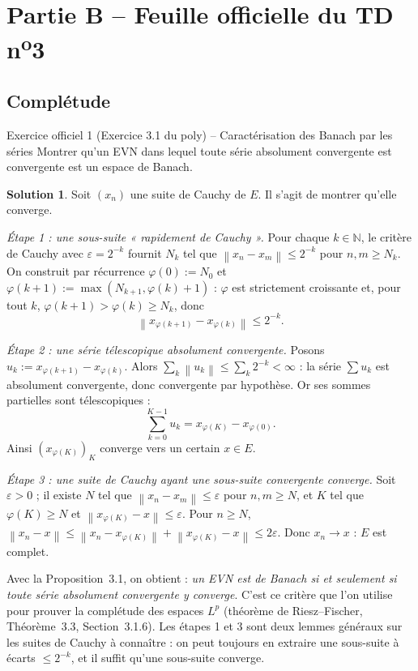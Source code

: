 \documentclass[11pt,a4paper]{article}
\newcommand{\N}{\mathbb{N}}
\newcommand{\norm}[1]{\left\|#1\right\|}
\theoremstyle{definition}
\newtheorem*{solution}{Solution}
\begin{document}
\section*{Partie B -- Feuille officielle du TD n\textsuperscript{o}3}

\subsection*{Complétude}

\begin{exo}{Exercice officiel 1 (Exercice 3.1 du poly) -- Caractérisation des Banach par les séries}
Montrer qu'un EVN dans lequel toute série absolument convergente est convergente est un espace de Banach.
\end{exo}

\begin{solution}
Soit $(x_n)$ une suite de Cauchy de $E$. Il s'agit de montrer qu'elle converge.

\emph{Étape 1 : une sous-suite « rapidement de Cauchy ».} Pour chaque $k\in\N$, le critère de Cauchy avec $\varepsilon=2^{-k}$ fournit $N_k$ tel que $\norm{x_n-x_m}\le2^{-k}$ pour $n,m\ge N_k$. On construit par récurrence $\varphi(0):=N_0$ et $\varphi(k+1):=\max(N_{k+1},\varphi(k)+1)$ : $\varphi$ est strictement croissante et, pour tout $k$, $\varphi(k+1)>\varphi(k)\ge N_k$, donc
\[
\norm{x_{\varphi(k+1)}-x_{\varphi(k)}}\le2^{-k}.
\]

\emph{Étape 2 : une série télescopique absolument convergente.} Posons $u_k:=x_{\varphi(k+1)}-x_{\varphi(k)}$. Alors $\sum_k\norm{u_k}\le\sum_k2^{-k}<\infty$ : la série $\sum u_k$ est absolument convergente, donc convergente par hypothèse. Or ses sommes partielles sont télescopiques :
\[
\sum_{k=0}^{K-1}u_k=x_{\varphi(K)}-x_{\varphi(0)} .
\]
Ainsi $(x_{\varphi(K)})_K$ converge vers un certain $x\in E$.

\emph{Étape 3 : une suite de Cauchy ayant une sous-suite convergente converge.} Soit $\varepsilon>0$ ; il existe $N$ tel que $\norm{x_n-x_m}\le\varepsilon$ pour $n,m\ge N$, et $K$ tel que $\varphi(K)\ge N$ et $\norm{x_{\varphi(K)}-x}\le\varepsilon$. Pour $n\ge N$, $\norm{x_n-x}\le\norm{x_n-x_{\varphi(K)}}+\norm{x_{\varphi(K)}-x}\le2\varepsilon$. Donc $x_n\to x$ : $E$ est complet.
\end{solution}

\begin{pointcle}
Avec la Proposition~3.1, on obtient : \emph{un EVN est de Banach si et seulement si toute série absolument convergente y converge}. C'est ce critère que l'on utilise pour prouver la complétude des espaces $L^p$ (théorème de Riesz--Fischer, Théorème~3.3, Section~3.1.6). Les étapes 1 et 3 sont deux lemmes généraux sur les suites de Cauchy à connaître : on peut toujours en extraire une sous-suite à écarts $\le2^{-k}$, et il suffit qu'une sous-suite converge.
\end{pointcle}
\end{document}
